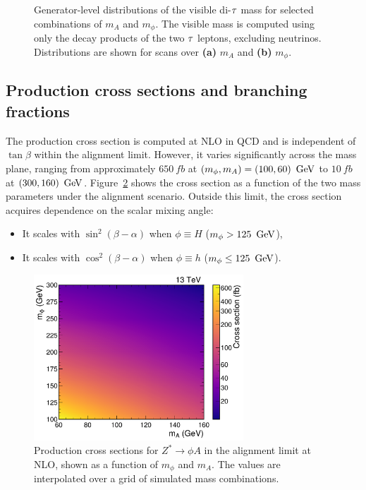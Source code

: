 \begin{figure}[!htbp]
\begin{subfigure}[b]{0.7\textwidth}
            \caption{}
        \end{subfigure}
    \caption[Generator-level visible mass distributions for different mass combinations of $\phi$ and A.]{Generator-level distributions of the visible di-$\tau$ mass for selected combinations of $m_A$ and $m_\phi$. The visible mass is computed using only the decay products of the two $\tau$ leptons, excluding neutrinos. Distributions are shown for scans over \textbf{(a)} $m_A$ and \textbf{(b)} $m_\phi$.}
    \label{Figure:Chapter6_GenVisDistributions}
\end{figure}

\subsection{Production cross sections and branching fractions}
\label{Section:Chapter6_production_xs_bf}
The production cross section is computed at \ac{NLO} in \ac{QCD} and is independent of $\tan\beta$ within the alignment limit. However, it varies significantly across the mass plane, ranging from approximately $650~\unit{fb}$ at $(m_\phi, m_A) = (100, 60)~\,\text{Ge\hspace{-.08em}V}$ to $10~\unit{fb}$ at $(300, 160)~\,\text{Ge\hspace{-.08em}V}$. Figure~\ref{Figure:Chapter6_ProductionXS} shows the cross section as a function of the two mass parameters under the alignment scenario. Outside this limit, the cross section acquires dependence on the scalar mixing angle:

\begin{itemize}
    \item It scales with $\sin^2(\beta - \alpha)$ when $\phi \equiv H$ ($m_\phi > 125~\,\text{Ge\hspace{-.08em}V}$),
    \item It scales with $\cos^2(\beta - \alpha)$ when $\phi \equiv h$ ($m_\phi \leq 125~\,\text{Ge\hspace{-.08em}V}$).
\end{itemize}

\begin{figure}[!htbp]
  \centering
  \includegraphics[width=0.7\textwidth]{Figures/Chapter6/Production_XS.pdf}
    \caption[Production cross sections for $Z^* \to \phi A$ in the alignment limit.]{Production cross sections for $Z^* \to \phi A$ in the alignment limit at \ac{NLO}, shown as a function of $m_\phi$ and $m_A$. The values are interpolated over a grid of simulated mass combinations.}
  \label{Figure:Chapter6_ProductionXS}
\end{figure}

